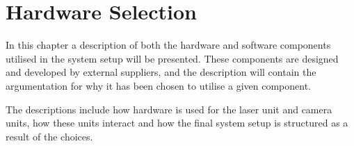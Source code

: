 \chapter{Hardware Selection}
\label{chp:tech}
In this chapter a description of both the hardware and software components utilised in the system setup will be presented. These components are designed and developed by external suppliers, and the description will contain the argumentation for why it has been chosen to utilise a given component.

The descriptions include how hardware is used for the laser unit and camera units, how these units interact and how the final system setup is structured as a result of the choices.







